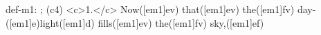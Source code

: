 def-m1: \grealign;
(c4) <c>1.</c> Now([em1]ev) that([em1]ev) the([em1]fv) day-([em1]e)light([em1]d) fills([em1]ev) the([em1]fv) sky,([em1]ef)
